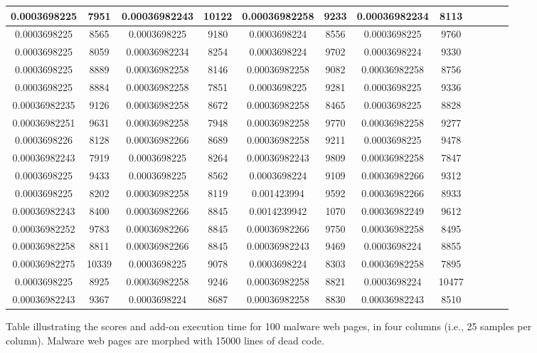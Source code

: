 \begin{figure}[h]
\begin{tabular}{|c|c|c|c|c|c|c|c|c|c|c|c|}
\midrule
0.0003698225&7951&0.00036982243&10122&0.00036982258&9233&0.00036982234&8113\\
\midrule
0.0003698225&8565&0.0003698225&9180&0.0003698224&8556&0.0003698225&9760\\
\midrule
0.0003698225&8059&0.00036982234&8254&0.0003698224&9702&0.0003698224&9330\\
\midrule
0.0003698225&8889&0.00036982258&8146&0.00036982258&9082&0.00036982258&8756\\
\midrule
0.0003698225&8884&0.00036982258&7851&0.0003698225&9281&0.0003698225&9336\\
\midrule
0.00036982235&9126&0.00036982258&8672&0.00036982258&8465&0.0003698225&8828\\
\midrule
0.00036982251&9631&0.00036982258&7948&0.00036982258&9770&0.00036982258&9277\\
\midrule
0.0003698226&8128&0.00036982266&8689&0.00036982258&9211&0.0003698225&9478\\
\midrule
0.00036982243&7919&0.0003698225&8264&0.00036982243&9809&0.00036982258&7847\\
\midrule
0.0003698225&9433&0.0003698225&8562&0.0003698224&9109&0.00036982266&9312\\
\midrule
0.0003698225&8202&0.00036982258&8119&0.001423994&9592&0.00036982266&8933\\
\midrule
0.00036982243&8400&0.00036982266&8845&0.0014239942&1070&0.00036982249&9612\\
\midrule
0.00036982252&9783&0.00036982266&8845&0.00036982266&9750&0.00036982258&8495\\
\midrule
0.00036982258&8811&0.00036982266&8845&0.00036982243&9469&0.0003698224&8855\\
\midrule
0.00036982275&10339&0.0003698225&9078&0.0003698224&8303&0.00036982258&7895\\
\midrule
0.0003698225&8925&0.00036982258&9246&0.00036982258&8821&0.0003698224&10477\\
\midrule
0.00036982243&9367&0.0003698224&8687&0.00036982258&8830&0.00036982243&8510\\
\midrule
\end{tabular}
    \caption[Scores table of malware web pages]{Table illustrating the scores and add-on execution time for 100 malware web pages, in four columns (i.e., 25 samples per column). Malware web pages are morphed with 15000 lines of dead code. }
    \label{fig:m15000table}
\end{figure}

